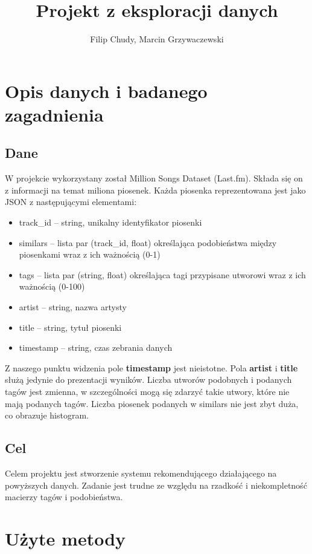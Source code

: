 \documentclass[a4paper,10pt]{article}
\title{Projekt z eksploracji danych}
\author{Filip Chudy, Marcin Grzywaczewski}
\begin{document}
\maketitle

\begin{abstract}

\end{abstract}
\section{Opis danych i badanego zagadnienia}
\subsection{Dane}
W projekcie wykorzystany został Million Songs Dataset (Last.fm). 
Składa się on z informacji na temat miliona piosenek.
Każda piosenka reprezentowana jest jako JSON z następującymi elementami:
\begin{itemize}
 \item track\_id -- string, unikalny identyfikator piosenki
 \item similars -- lista par (track\_id, float) określająca podobieństwa między piosenkami wraz z ich ważnością (0-1)
 \item tags -- lista par (string, float) określająca tagi przypisane utworowi wraz z ich ważnością (0-100)
 \item artist -- string, nazwa artysty
 \item title -- string, tytuł piosenki
 \item timestamp -- string, czas zebrania danych
\end{itemize}

Z naszego punktu widzenia pole \textbf{timestamp} jest nieistotne.
Pola \textbf{artist} i \textbf{title} służą jedynie do prezentacji wyników.
Liczba utworów podobnych i podanych tagów jest zmienna, w szczególności mogą się zdarzyć takie utwory, które nie mają podanych tagów.
Liczba piosenek podanych w similars nie jest zbyt duża, co obrazuje histogram.

\subsection{Cel}
Celem projektu jest stworzenie systemu rekomendującego działającego na powyższych danych.
Zadanie jest trudne ze względu na rzadkość i niekompletność macierzy tagów i podobieństwa.

\section{Użyte metody}
\end{document}
